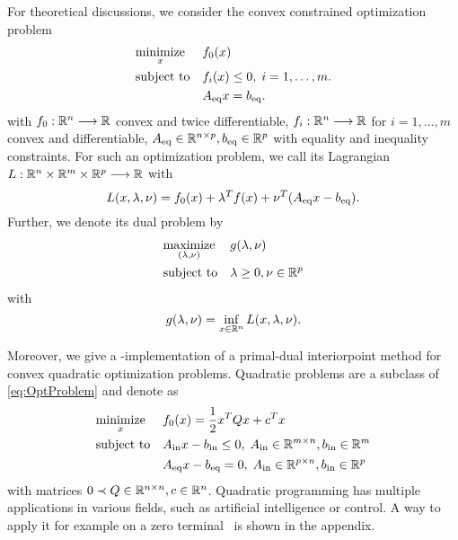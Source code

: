 For theoretical discussions, we consider the convex constrained optimization problem
\begin{equation}
\OptProblem
\label{eq:OptProblem}
\end{equation}
with $ f_0:\mathbb{R}^n \longrightarrow \mathbb{R} $ convex and twice differentiable, $ f_i:\mathbb{R}^n \longrightarrow \mathbb{R} $ for $ i=1,\dots,m $ convex and differentiable,
$ {A}_{\mathrm{eq}} \in \mathbb{R}^{n\times p}, {b}_{\mathrm{eq}} \in  \mathbb{R}^p $ with equality and inequality constraints. For such an optimization problem, we call its Lagrangian $ L:\mathbb{R}^n \times \mathbb{R}^m \times \mathbb{R}^p \longrightarrow \mathbb{R} $
with  \[ L(x,\lambda,\nu) = f_0(x) + \lambda^T f(x) + \nu ^T ({A}_{\mathrm{eq}} x - {b}_{\mathrm{eq}}).  \]
Further, we denote its dual problem by
\begin{equation}
	\OptProblemDual
	\label{eq:OptProblemDual}
\end{equation}
with \[ g(\lambda, \nu) = \inf_{x\in \mathbb{R}^n} L(x,\lambda,\nu). \]


Moreover, we give a \matlab-implementation of a primal-dual interiorpoint method for  convex quadratic optimization problems. Quadratic problems are a subclass of \eqref{eq:OptProblem} and denote as
\begin{equation}
	\OptProblemquad
	\label{eq:QuadProblem}
\end{equation}
with matrices $ 0 \prec Q\in \mathbb{R}^{n \times n}, c\in \mathbb{R}^n $.
Quadratic programming has multiple applications in various fields, such as artificial intelligence or control. A way to apply it for example on a zero terminal \mpclong \ is shown in the appendix.